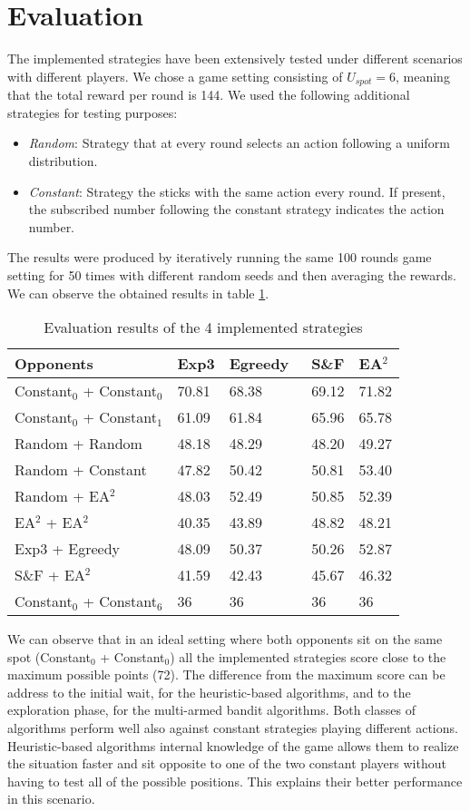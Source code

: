 \documentclass[runningheads]{llncs}
\begin{document}
\section{Evaluation}
The implemented strategies have been extensively tested under
different scenarios with different players. We chose a game setting
consisting of $U_{spot} = 6$, meaning that the total reward per round
is 144. We used the following additional strategies for testing
purposes:
\begin{itemize}
\item \textit{Random}: Strategy that at every round selects an action
following a uniform distribution.
\item \textit{Constant}: Strategy the sticks with the same action
every round. If present, the subscribed number following the constant
strategy indicates the action number.
\end{itemize}
The results were produced by iteratively running the same 100 rounds game setting
for 50 times with different random seeds and then averaging the
rewards. We can observe the obtained results in table \ref{result-table}.
\begin{table}[h!]
\centering
\caption{Evaluation results of the 4 implemented strategies}
\label{result-table}
\begin{tabular}{l|l|l|l|l}
Opponents       & Exp3 \; & Egreedy \, & S\&F \;\; & EA$^2$   \\
\hline
Constant$_0$ + Constant$_0$ \;& 70.81 & 68.38   & 69.12 & 71.82 \\
Constant$_0$ + Constant$_1$ & 61.09 & 61.84   & 65.96 & 65.78 \\
Random + Random  \;   & 48.18 & 48.29   & 48.20 & 49.27 \\
Random + Constant    & 47.82 & 50.42   & 50.81 & 53.40 \\
Random + EA$^2$   & 48.03 & 52.49   & 50.85 & 52.39 \\
EA$^2$ + EA$^2$ & 40.35 & 43.89  & 48.82 & 48.21 \\
Exp3 + Egreedy  & 48.09 & 50.37   & 50.26 & 52.87 \\
S\&F + EA$^2$       & 41.59 & 42.43   & 45.67 & 46.32 \\
Constant$_0$ + Constant$_6$ & 36    & 36      & 36    & 36
\end{tabular}
\end{table}

We can observe that in an ideal setting where both opponents sit on
the same spot (Constant$_0$ + Constant$_0$) all the implemented
strategies score close to the maximum possible points (72). The
difference from the maximum score can be address to the initial
wait, for the heuristic-based algorithms, and to the exploration
phase, for the multi-armed bandit algorithms. Both classes of
algorithms perform well also against constant strategies playing
different actions. Heuristic-based algorithms internal knowledge of
the game allows them to realize the situation faster and sit opposite
to one of the two constant players without having to test all of the
possible positions. This explains their better performance in this
scenario.
\end{document}
